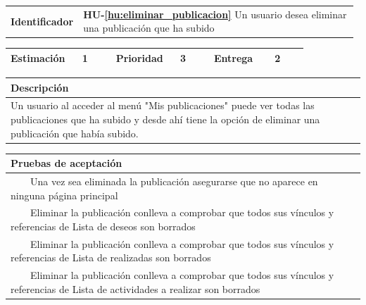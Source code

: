 \documentclass[11pt]{article}
\newcommand{\tabitem}{~~\llap{\textbullet}~~}
\begin{document}
\begin{longtable}{p{0.18\linewidth}|p{0.8\linewidth}}
  \rowcolor{LightCyan}
  \textbf{Identificador} & \textbf{HU-\ref{hu:eliminar_publicacion}} Un usuario desea eliminar una publicación que ha subido \\  
\end{longtable}
\vspace{-0.8cm}
\begin{longtable}{p{0.18\linewidth}|p{0.1\linewidth}|p{0.18\linewidth}|p{0.1\linewidth}|p{0.18\linewidth}|p{0.1\linewidth}}
  \toprule
  \textbf{Estimación} & 1 & \textbf{Prioridad} & 3 & \textbf{Entrega} & 2 \\
  \bottomrule
\end{longtable}
\vspace{-0.8cm}
\begin{longtable}{p{1.028\linewidth}}
  \textbf{Descripción}\\
  \midrule Un usuario al acceder al menú "Mis publicaciones" puede ver todas las publicaciones que ha subido y desde ahí tiene la opción de eliminar una publicación que había subido.\\
  \bottomrule
\end{longtable}
\vspace{-0.8cm}
\begin{longtable}{p{1.028\linewidth}}
  \textbf{Pruebas de aceptación}\\
  \midrule
  \tabitem Una vez sea eliminada la publicación asegurarse que no aparece en ninguna página principal\\
  \tabitem Eliminar la publicación conlleva a comprobar que todos sus vínculos y referencias de Lista de deseos son borrados\\
  \tabitem Eliminar la publicación conlleva a comprobar que todos sus vínculos y referencias de Lista de realizadas son borrados\\
  \tabitem Eliminar la publicación conlleva a comprobar que todos sus vínculos y referencias de Lista de actividades a realizar son borrados\\
\end{longtable}
\vspace{-0.8cm}
\end{document}

